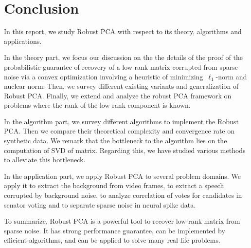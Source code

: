 \section*{Conclusion}

In this report, we study Robust PCA with respect to its theory, algorithms and applications.

In the theory part, we focus our discussion on the the details of the proof of the probabilistic guarantee of recovery of a low rank matrix corrupted from sparse noise via a convex optimization involving a heuristic of minimizing~$\ell_1$-norm and nuclear norm. Then, we  survey different existing variants and generalization of Robust PCA. Finally, we extend and analyze the robust PCA framework on problems where the rank of the low rank component is known.   

In the algorithm part, we survey different algorithms to implement the Robust PCA. Then we compare their theoretical complexity and convergence rate on synthetic data. We remark that the bottleneck to the algorithm lies on the computation of SVD of matrix. Regarding this, we have studied various methods to alleviate this bottleneck. 

In the application part, we apply Robust PCA to several problem domains. We apply it to extract the background from video frames, to extract a speech corrupted by background noise, to analyze correlation of votes for candidates in senator voting and to separate sparse noise in neural spike data. 

To summarize, Robust PCA is a powerful tool to recover low-rank matrix from sparse noise. It has strong performance guarantee, can be implemented by efficient algorithms, and can be applied to solve many real life problems. 